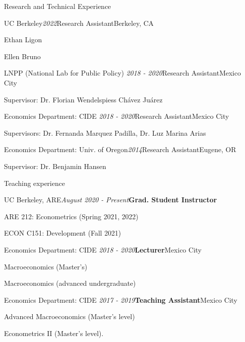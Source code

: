 \documentclass{resume} %
\begin{document}
\begin{rSection}{Research and Technical Experience}

\begin{rSubsection}{UC Berkeley}{\textit{2022}}{Research Assistant}{Berkeley, CA}
    \item Ethan Ligon
    \item Ellen Bruno
\end{rSubsection}

\begin{rSubsection}{LNPP (National Lab for Public Policy)}{\textit{ 2018 - 2020}}{Research Assistant}{Mexico City}
\item Supervisor: Dr. Florian Wendelspiess Chávez Juárez
\end{rSubsection}


\begin{rSubsection}{Economics Department: CIDE}{\textit{ 2018 -  2020}}{Research Assistant}{Mexico City}
\item Supervisors: Dr. Fernanda Marquez Padilla, Dr. Luz Marina Arias 
\end{rSubsection}

\begin{rSubsection}{Economics Department: Univ. of Oregon}{\textit{2014}}{Research Assistant}{Eugene, OR}
\item Supervisor: Dr. Benjamin Hansen
\end{rSubsection}
\end{rSection}


\begin{rSection}{Teaching experience}

\begin{rSubsection}{UC Berkeley, ARE}{\textit{August 2020 - Present}}{\textbf{Grad. Student Instructor}}{}
\item ARE 212: Econometrics (Spring 2021, 2022)
\item ECON C151: Development (Fall 2021)
\end{rSubsection}

\begin{rSubsection}{Economics Department: CIDE}{\textit{ 2018 -  2020}}{\textbf{Lecturer}}{Mexico City}
\item Macroeconomics (Master's)
\item Macroeconomics (advanced undergraduate)
\end{rSubsection}

\begin{rSubsection}{Economics Department: CIDE}{\textit{ 2017 - 2019}}{\textbf{Teaching Assistant}}{Mexico City}
\item Advanced Macroeconomics (Master's level) 
\item Econometrics II (Master's level).
\end{rSubsection}

\end{rSection}
\end{document}
